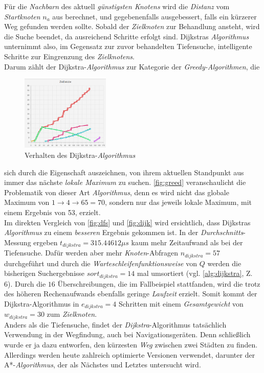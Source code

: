 \documentclass[12pt]{article}
\begin{document}
\noindent Für die \textit{Nachbarn} des aktuell \textit{günstigsten Knotens} wird die \textit{Distanz} vom \textit{Startknoten} $n_a$ aus berechnet, und gegebenenfalls ausgebessert, falls ein kürzerer Weg gefunden werden sollte. Sobald der \textit{Zielknoten} zur Behandlung ansteht, wird die Suche beendet, da ausreichend Schritte erfolgt sind. Dijkstras \textit{Algorithmus} unternimmt also, im Gegensatz zur zuvor behandelten Tiefensuche, intelligente Schritte zur Eingrenzung des \textit{Zielknotens}. 
\\
Darum zählt der Dijkstra-\textit{Algorithmus} zur Kategorie der \textit{Greedy-Algorithmen}, die
\begin{figure}
\vspace{-20pt}
\begin{center}
\includegraphics[width=0.375\textwidth]{res/dijk_time.png}
\end{center}
\vspace{-30pt}
\centering
\caption{Verhalten des Dijkstra-\textit{Algorithmus}}
\label{fig:dijk-time}
\end{figure}

\noindent sich durch die Eigenschaft auszeichnen, von ihrem aktuellen Standpunkt aus immer das  nächste \textit{lokale Maximum} zu suchen. \autoref{fig:greed} veranschaulicht die Problematik von dieser Art \textit{Algorithmus}, denn es wird nicht das globale Maximum von $1 \to 4 \to 65 = 70$, sondern nur das jeweils lokale Maximum, mit einem Ergebnis von 53, erzielt.
\\
Im direkten Vergleich von \autoref{fig:dfs} und \autoref{fig:dijk} wird ersichtlich, dass Dijkstras \textit{Algorithmus} zu einem \textit{besseren} Ergebnis gekommen ist. In der \textit{Durchschnitts}-Messung ergeben $t_{dijkstra} = 315.44612\mu s$ kaum mehr Zeitaufwand als bei der Tiefensuche. Dafür werden aber mehr \textit{Knoten}-Abfragen $n_{dijkstra} = 57$ durchgeführt und durch die \textit{Warteschleifenfunktionsweise} von $Q$ werden die bisherigen Suchergebnisse $sort_{dijkstra} = 14$ mal umsortiert (vgl. \autoref{alg:dijkstra}, Z. 6). Durch die $16$ Überschreibungen, die im Fallbeispiel stattfanden, wird die trotz des höheren Rechenaufwands ebenfalls geringe \textit{Laufzeit} erzielt. Somit kommt der Dijkstra-Algorithmus in $e_{dijkstra} = 4$ Schritten mit einem \textit{Gesamtgewicht} von $w_{dijkstra} = 30$ zum \textit{Zielknoten}.
\\
Anders als die Tiefensuche, findet der \textit{Dijkstra}-Algorithmus tatsächlich Verwendung in der Wegfindung, auch bei Navigationsgeräten. Denn schließlich wurde er ja dazu entworfen, den kürzesten \textit{Weg} zwischen zwei Städten zu finden. Allerdings werden heute zahlreich optimierte Versionen verwendet, darunter der A*-\textit{Algorithmus}, der als Nächstes und Letztes untersucht wird.
\end{document}
